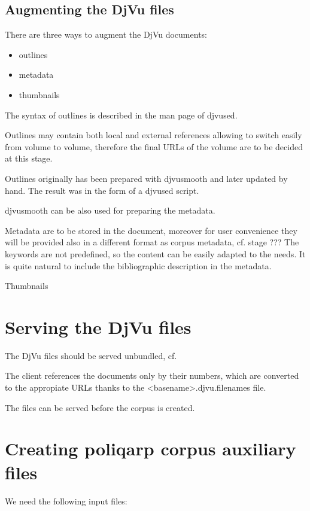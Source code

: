 \documentclass{article}
\begin{document}
\subsection{Augmenting the DjVu files}
\label{sec:augm-djvu-files}

There are three ways to augment the DjVu documents:
\begin{itemize}
\item outlines
\item metadata
\item thumbnails
\end{itemize}

The syntax of outlines is described in the man page of djvused.

Outlines may contain both local and external references allowing to
switch easily from volume to volume, therefore the final URLs of the
volume are to be decided at this stage. 

Outlines originally has been prepared with djvusmooth and later
updated by hand. The result was in the form of a djvused script.

djvusmooth can be also used for preparing the
metadata.

Metadata are to be stored in the document, moreover for user
convenience they will be provided also in a different format as corpus
metadata, cf. stage ??? The keywords are not predefined, so the
content can be easily adapted to the needs. It is quite natural to
include the bibliographic description in the metadata.

Thumbnails

\section{Serving the DjVu files}
\label{sec:serving-djvu-files}

The DjVu files should be served unbundled, cf. 

The client references the documents only by their numbers, which are
converted to the appropiate URLs thanks to the
<basename>.djvu.filenames file.

The files can be served before the corpus is created.

\section{Creating poliqarp corpus auxiliary files}
\label{sec:creat-poliq-corp-1}

We need the following input files:
\end{document}

